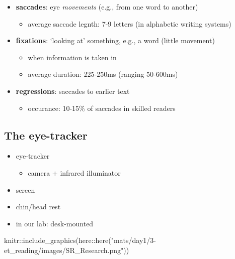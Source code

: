 \documentclass[
  letterpaper,
  DIV=11,
  numbers=noendperiod]{scrartcl}
\newenvironment{Shaded}{\begin{snugshade}}{\end{snugshade}}
\newcommand{\FunctionTok}[1]{\textcolor[rgb]{0.28,0.35,0.67}{#1}}
\newcommand{\NormalTok}[1]{\textcolor[rgb]{0.00,0.23,0.31}{#1}}
\newcommand{\SpecialCharTok}[1]{\textcolor[rgb]{0.37,0.37,0.37}{#1}}
\newcommand{\StringTok}[1]{\textcolor[rgb]{0.13,0.47,0.30}{#1}}
\providecommand{\tightlist}{%
  \setlength{\itemsep}{0pt}\setlength{\parskip}{0pt}}\usepackage{longtable,booktabs,array}
\begin{document}
\begin{itemize}
\tightlist
\item
  \textbf{saccades}: eye \emph{movements} (e.g., from one word to
  another)

  \begin{itemize}
  \tightlist
  \item
    average saccade legnth: 7-9 letters (in alphabetic writing systems)
  \end{itemize}
\item
  \textbf{fixations}: `looking at' something, e.g., a word (little
  movement)

  \begin{itemize}
  \tightlist
  \item
    when information is taken in
  \item
    average duration: 225-250ms (ranging 50-600ms)
  \end{itemize}
\item
  \textbf{regressions}: saccades to earlier text

  \begin{itemize}
  \tightlist
  \item
    occurance: 10-15\% of saccades in skilled readers
  \end{itemize}
\end{itemize}

\hypertarget{the-eye-tracker}{%
\subsection{The eye-tracker}\label{the-eye-tracker}}

\begin{itemize}
\tightlist
\item
  eye-tracker

  \begin{itemize}
  \tightlist
  \item
    camera \(+\) infrared illuminator
  \end{itemize}
\item
  screen
\item
  chin/head rest
\item
  in our lab: desk-mounted
\end{itemize}

\begin{Shaded}
\begin{Highlighting}[]
\NormalTok{knitr}\SpecialCharTok{::}\FunctionTok{include\_graphics}\NormalTok{(here}\SpecialCharTok{::}\FunctionTok{here}\NormalTok{(}\StringTok{"mats/day1/3{-}et\_reading/images/SR\_Research.png"}\NormalTok{))}
\end{Highlighting}
\end{Shaded}
\end{document}
